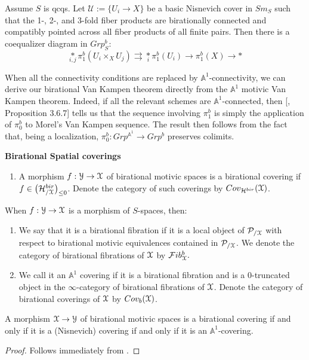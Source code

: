 \begin{thm}\label{bvk}
Assume $S$ is qcqs. Let $\mathcal{U}:=\{U_i\to X\}$ be a basic Nisnevich cover in $Sm_S$ such that the 1-, 2-, and 3-fold fiber products are birationally connected and compatibly pointed across all fiber products of all finite pairs. Then there is a coequalizer diagram in $Grp_S^b$:
$$\underset{i,j}{*}\pi_1^b({U_i\times_XU_j})\rightrightarrows \underset{i}{*}\pi_1^b({U_i})\to \pi_1^b(X)\to *$$
\end{thm}
\begin{rem}
   When all the connectivity conditions are replaced by $\mathbb{A}^1$-connectivity, we can derive our birational Van Kampen theorem  directly from the $\mathbb{A}^1$ motivic Van Kampen theorem. Indeed, if all the relevant schemes are $\mathbb{A}^1$-connected, then [\cite{0bat}, Proposition 3.6.7] tells us that the sequence involving $\pi_1^b$ is simply the application of $\pi_0^b$ to Morel's Van Kampen sequence. The result then follows from the fact that, being a localization, $\pi_0^b: Grp^{\mathbb{A}^1}\to Grp^b$ preserves colimits.
\end{rem}

\textbf{Birational Spatial coverings}

\begin{defn}
\begin{enumerate}
\item  A morphism $f:\EuScript{Y}\to \EuScript{X}$ of birational motivic spaces is a birational covering if $f\in \big({\mathcal{H}^{bir}_{/\EuScript{X}}}\big)_{\leq 0}$. Denote the category of such coverings by $Cov_{\mathcal{H}^{bir}}(\EuScript{X})$. 
\end{enumerate}
When $f:\EuScript{Y}\to \EuScript{X}$ is a morphism of $S$-spaces, then:
\begin{enumerate}[resume] 
    \item We say that it is a birational fibration if it is a local object of ${\mathcal{P}}_{/\EuScript{X}}$ with respect to birational motivic equivalences contained in ${\mathcal{P}}_{/\EuScript{X}}$. We denote the category of birational fibrations of $\EuScript{X}$ by $\mathcal{F}ib_{\EuScript{X}}^{b}.$
\item We call it an $\mathbb{A}^1$ covering if it is a birational fibration and is a $0$-truncated object in the $\infty$-category of birational fibrations of $\EuScript{X}$. Denote the category of birational coverings of $\EuScript{X}$ by $Cov_{b}(\EuScript{X})$.
\end{enumerate}
\end{defn}
\begin{prop}
A morphism $\EuScript{X}\to \EuScript{Y}$ of birational motivic spaces is a birational covering if and only if it is a (Nisnevich) covering if and only if it is an $\mathbb{A}^1$-covering.
\end{prop}
\begin{proof}
Follows immediately from .
\end{proof}

